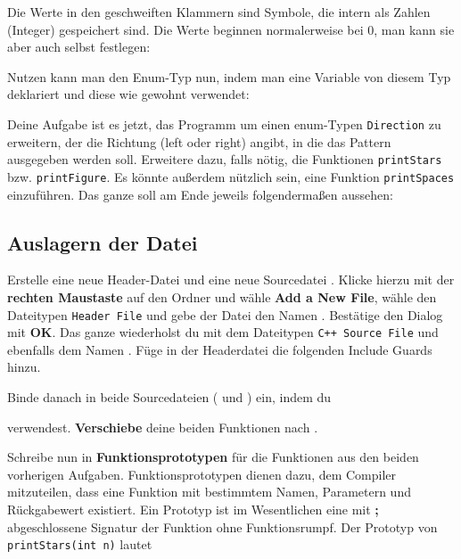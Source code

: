Die Werte in den geschweiften Klammern sind Symbole, die intern als Zahlen (Integer) gespeichert sind. Die Werte beginnen normalerweise bei 0, man kann sie aber auch selbst festlegen:


Nutzen kann man den Enum-Typ nun, indem man eine Variable von diesem Typ deklariert und diese wie gewohnt verwendet:


Deine Aufgabe ist es jetzt, das Programm um einen enum-Typen \lstinline{Direction} zu erweitern, der die Richtung (left oder right) angibt, in die das Pattern ausgegeben werden soll. Erweitere dazu, falls nötig, die Funktionen \lstinline{printStars} bzw. \lstinline{printFigure}. Es könnte außerdem nützlich sein, eine Funktion \lstinline{printSpaces} einzuführen.
Das ganze soll am Ende jeweils folgendermaßen aussehen:


\subsection{Auslagern der Datei}
Erstelle eine neue Header-Datei \textbf{} und eine neue
Sourcedatei \textbf{}.
Klicke hierzu mit der \textbf{rechten Maustaste} auf den Ordner \textbf{} und wähle \textbf{Add a New File}, wähle den Dateitypen \texttt{Header File} und gebe der Datei den Namen . 
Bestätige den Dialog mit \textbf{OK}.
Das ganze wiederholst du mit dem Dateitypen \texttt{C++ Source File} und ebenfalls dem Namen .
Füge in der Headerdatei die folgenden Include Guards hinzu.


Binde danach  in beide Sourcedateien ( und ) ein, indem du


verwendest.
\textbf{Verschiebe} deine beiden Funktionen nach .

Schreibe nun in  \textbf{Funktionsprototypen} für die Funktionen aus den beiden vorherigen Aufgaben.
Funktionsprototypen dienen dazu, dem Compiler mitzuteilen, dass eine Funktion mit bestimmtem Namen, Parametern und Rückgabewert existiert.
Ein Prototyp ist im Wesentlichen eine mit \textbf{;} abgeschlossene Signatur der Funktion ohne Funktionsrumpf.
Der Prototyp von \lstinline{printStars(int n)} lautet 

